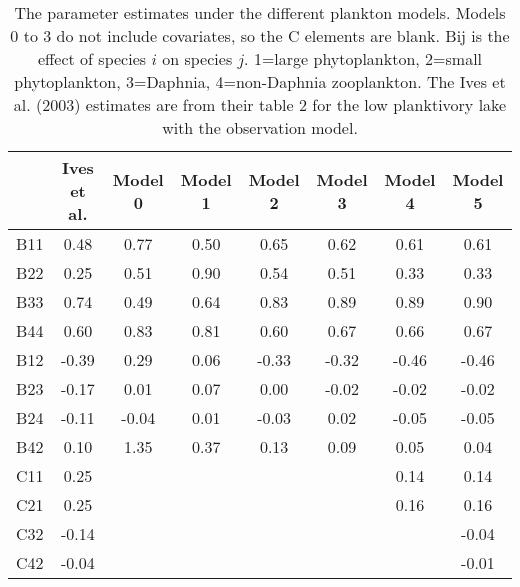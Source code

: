 \begin{table}[htp]
\centering
\caption{The parameter estimates under the different plankton models.  Models 0 to 3 do not include covariates, so the C elements are blank.  Bij is the effect of species $i$ on species $j$. 1=large phytoplankton, 2=small phytoplankton, 3=Daphnia, 4=non-Daphnia zooplankton. The Ives et al. (2003) estimates are from their table 2 for the low planktivory lake with the observation model.} 
\label{ref:tableplank}
\begin{tabular}{cccccccc}
  \hline
 & Ives et al. & Model 0 & Model 1 & Model 2 & Model 3 & Model 4 & Model 5 \\ 
  \hline
B11 & 0.48 & 0.77 & 0.50 & 0.65 & 0.62 & 0.61 & 0.61 \\ 
  B22 & 0.25 & 0.51 & 0.90 & 0.54 & 0.51 & 0.33 & 0.33 \\ 
  B33 & 0.74 & 0.49 & 0.64 & 0.83 & 0.89 & 0.89 & 0.90 \\ 
  B44 & 0.60 & 0.83 & 0.81 & 0.60 & 0.67 & 0.66 & 0.67 \\ 
  B12 & -0.39 & 0.29 & 0.06 & -0.33 & -0.32 & -0.46 & -0.46 \\ 
  B23 & -0.17 & 0.01 & 0.07 & 0.00 & -0.02 & -0.02 & -0.02 \\ 
  B24 & -0.11 & -0.04 & 0.01 & -0.03 & 0.02 & -0.05 & -0.05 \\ 
  B42 & 0.10 & 1.35 & 0.37 & 0.13 & 0.09 & 0.05 & 0.04 \\ 
  C11 & 0.25 &  &  &  &  & 0.14 & 0.14 \\ 
  C21 & 0.25 &  &  &  &  & 0.16 & 0.16 \\ 
  C32 & -0.14 &  &  &  &  &  & -0.04 \\ 
  C42 & -0.04 &  &  &  &  &  & -0.01 \\ 
   \hline
\end{tabular}
\end{table}
